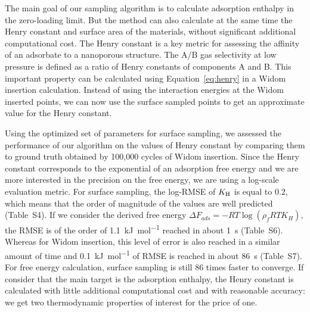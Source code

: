 \documentclass[main]{subfiles}
\begin{document}
The main goal of our sampling algorithm is to calculate adsorption enthalpy in the zero-loading limit. But the method can also calculate at the same time the Henry constant and surface area of the materials, without significant additional computational cost. The Henry constant is a key metric for assessing the affinity of an adsorbate to a nanoporous structure. The A/B gas selectivity at low pressure is defined as a ratio of Henry constants of components A and B. This important property can be calculated using Equation~\ref{eq:henry} in a Widom insertion calculation. Instead of using the interaction energies at the Widom inserted points, we can now use the surface sampled points to get an approximate value for the Henry constant.

Using the optimized set of parameters for surface sampling, we assessed the performance of our algorithm on the values of Henry constant by comparing them to ground truth obtained by 100,000 cycles of Widom insertion. Since the Henry constant corresponds to the exponential of an adsorption free energy and we are more interested in the precision on the free energy, we are using a log-scale evaluation metric. For surface sampling, the log-RMSE of $K_{\text{H}}$ is equal to $0.2$, which means that the order of magnitude of the values are well predicted (Table~S4). If we consider the derived free energy $\Delta F_{ads} = -RT \log(\rho_fRT K_H)$, the RMSE is of the order of \SI{1.1}{\kilo\joule\per\mole} reached in about \SI{1}{\second} (Table~S6). Whereas for Widom insertion, this level of error is also reached in a similar amount of time and \SI{0.1}{\kilo\joule\per\mole} of RMSE is reached in about \SI{86}{\second} (Table~S7). For free energy calculation, surface sampling is still 86 times faster to converge. If consider that the main target is the adsorption enthalpy, the Henry constant is calculated with little additional computational cost and with reasonable accuracy: we get two thermodynamic properties of interest for the price of one.
\end{document}
